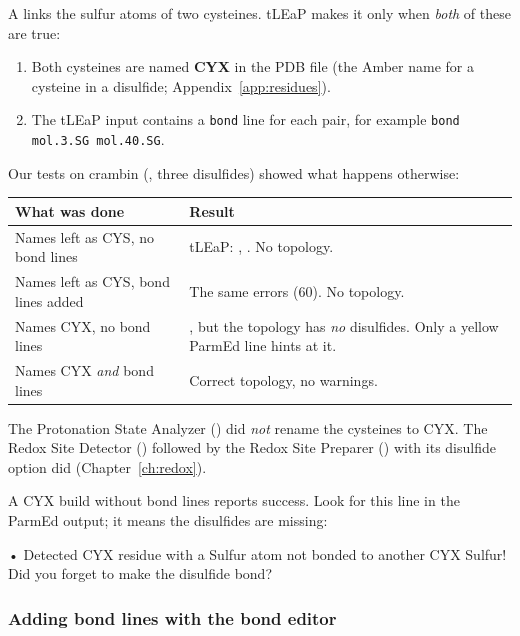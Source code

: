 A  links the sulfur atoms of two cysteines. tLEaP makes
it only when \emph{both} of these are true:

\begin{enumerate}
  \item Both cysteines are named \textbf{CYX} in the PDB file (the Amber name
        for a cysteine in a disulfide; Appendix~\ref{app:residues}).
  \item The tLEaP input contains a \texttt{bond} line for each pair, for
        example \texttt{bond mol.3.SG mol.40.SG}.
\end{enumerate}

Our tests on crambin (, three disulfides) showed what happens
otherwise:

\begin{tabularx}{\linewidth}{@{}lL@{}}
\toprule
\textbf{What was done} & \textbf{Result} \\
\midrule
Names left as CYS, no bond lines &
  tLEaP: , . No topology. \\
Names left as CYS, bond lines added &
  The same errors (60). No topology. \\
Names CYX, no bond lines &
  , but the topology has \emph{no} disulfides. Only a
  yellow ParmEd line hints at it. \\
Names CYX \emph{and} bond lines & Correct topology, no warnings. \\
\bottomrule
\end{tabularx}

\medskip
The Protonation State Analyzer () did \emph{not} rename the cysteines
to CYX. The Redox Site Detector () followed by the Redox Site Preparer
() with its disulfide option did (Chapter~\ref{ch:redox}).

\begin{watchout}
A CYX build without bond lines reports success. Look for this line in the
ParmEd output; it means the disulfides are missing:
\begin{screen}
• Detected CYX residue with a Sulfur atom not bonded to another CYX
  Sulfur! Did you forget to make the disulfide bond?
\end{screen}
\end{watchout}

\subsubsection{Adding bond lines with the bond editor}

